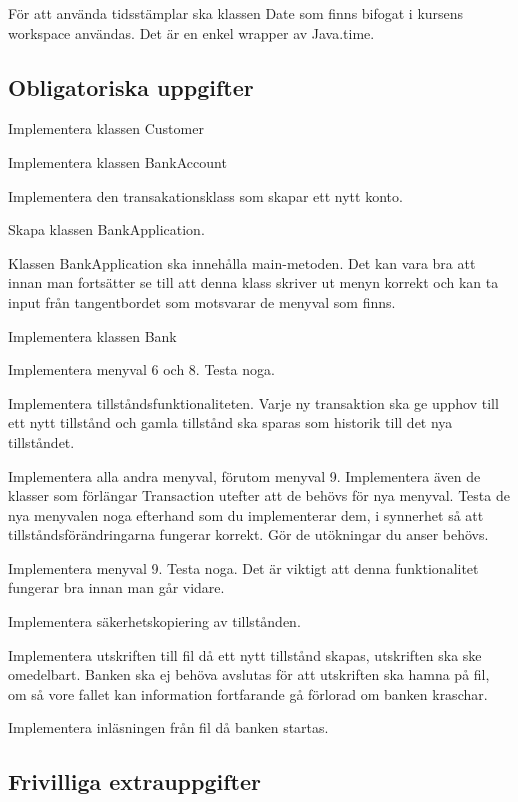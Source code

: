 För att använda tidsstämplar ska klassen Date som finns bifogat i kursens workspace användas. Det är en enkel wrapper av Java.time.


\subsection{Obligatoriska uppgifter}

\Task Implementera klassen Customer

\Task Implementera klassen BankAccount

\Task Implementera den transakationsklass som skapar ett nytt konto.

\Task Skapa klassen BankApplication.

\Subtask Klassen BankApplication ska innehålla main-metoden. Det kan vara bra att innan man fortsätter se till att denna klass skriver ut menyn korrekt och kan ta input från tangentbordet som motsvarar de menyval som finns.

\Task Implementera klassen Bank

\Subtask Implementera menyval 6 och 8. Testa noga.

\Subtask Implementera tillståndsfunktionaliteten. Varje ny transaktion ska ge upphov till ett nytt tillstånd och gamla tillstånd ska sparas som historik till det nya tillståndet.

\Subtask Implementera alla andra menyval, förutom menyval 9. Implementera även de klasser som förlängar Transaction utefter att de behövs för nya menyval.
Testa de nya menyvalen noga efterhand som du implementerar dem, i synnerhet så att tillståndsförändringarna fungerar korrekt. Gör de utökningar du anser behövs. 

\Task Implementera menyval 9. Testa noga. Det är viktigt att denna funktionalitet fungerar bra innan man går vidare.

\Task Implementera säkerhetskopiering av tillstånden.

\Subtask Implementera utskriften till fil då ett nytt tillstånd skapas, utskriften ska ske omedelbart. Banken ska ej behöva avslutas för att utskriften ska hamna på fil, om så vore fallet kan information fortfarande gå förlorad om banken kraschar.

\Subtask Implementera inläsningen från fil då banken startas.


\subsection{Frivilliga extrauppgifter}

